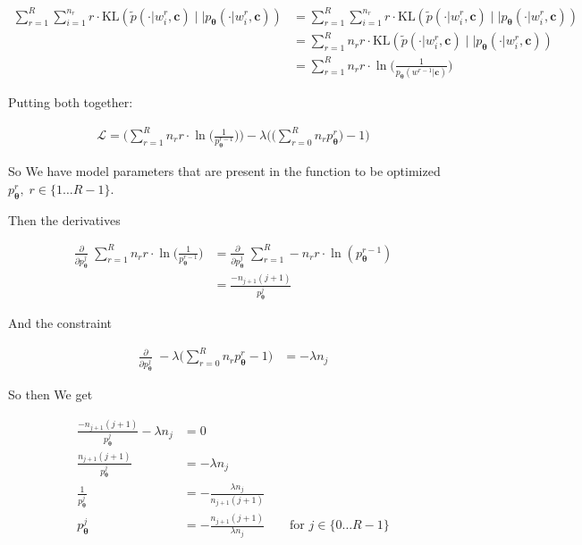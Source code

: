 \documentclass{article}
\newcommand{\KL}{\mathrm{KL}}
\newcommand{\vtheta}{\boldsymbol{\theta}}
\newcommand{\model}{p_{\vtheta}}
\newcommand{\context}{\boldsymbol{c}}
\begin{document}
			\begin{align}
				\sum^R_{r=1} \sum^{n_r}_{i=1} r\cdot \KL( \tilde{p}(\cdot|w^{r}_i,\context)\mid\mid \model(\cdot | w^{r}_i,\context)) &= \sum^R_{r=1} \sum^{n_r}_{i=1} r\cdot \KL( \tilde{p}(\cdot|w^{r}_i,\context)\mid\mid \model(\cdot | w^{r}_i,\context))\\
				&= \sum^R_{r=1} n_r r\cdot \KL( \tilde{p}(\cdot|w^{r}_i,\context)\mid\mid \model(\cdot | w^{r}_i,\context))\\
				&= \sum^R_{r=1} n_r r\cdot \ln\bigg(\frac{1}{\model(w^{r-1}|\context)} \bigg)
			\end{align}
			
			Putting both together:
			
			\begin{align}
				\mathcal{L} = \bigg(\sum^R_{r=1} n_r r\cdot \ln\bigg(\frac{1}{\model^{r-1}} \bigg)\bigg) - \lambda\bigg( \bigg(\sum^{R}_{r=0} n_r \model^r \bigg) - 1 \bigg)
			\end{align}
			
			So We have model parameters that are present in the function to be optimized $\model^r,\;r\in\{1\ldots R-1\}$. 
			
			Then the derivatives
			
			\begin{align}
				\frac{\partial}{\partial \model^j}\; \sum^R_{r=1} n_r r\cdot \ln\bigg(\frac{1}{\model^{r-1}} \bigg) &= \frac{\partial}{\partial \model^j}\; \sum^R_{r=1} -n_r r\cdot \ln(\model^{r-1})\\
				&=  \frac{-n_{j+1} (j+1)}{\model^{j}}
			\end{align}
			
			And the constraint
			
			\begin{align}
				\frac{\partial}{\partial \model^j}\; - \lambda\bigg( \sum^{R}_{r=0} n_r \model^r - 1 \bigg) &= -\lambda n_j
			\end{align}
			
			So then We get
			
			\begin{align}
				\frac{-n_{j+1} (j+1)}{\model^{j}} -\lambda n_j &= 0\\
				\frac{n_{j+1} (j+1)}{\model^{j}}  &= -\lambda n_j\\
				\frac{1}{\model^{j}}  &= -\frac{\lambda n_j}{n_{j+1} (j+1)}\\
				\model^{j}  &= -\frac{n_{j+1} (j+1)}{\lambda n_j}\qquad\text{for }j\in\{0\ldots R-1\}
			\end{align}
			
\end{document}

